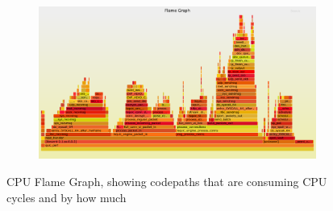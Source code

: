 \begin{frame}

\begin{figure}[!htb]
    \centering
    \begin{subfigure}{1\textwidth}
        \includegraphics[width=\linewidth]{./plots/perf_flame_graphs/quic/kernel.png}
    \end{subfigure}
    
    \caption{CPU Flame Graph, showing codepaths that are consuming CPU cycles and by how much}\label{fig:cpu-flame-graph-}
\end{figure}

\end{frame}
\clearpage

